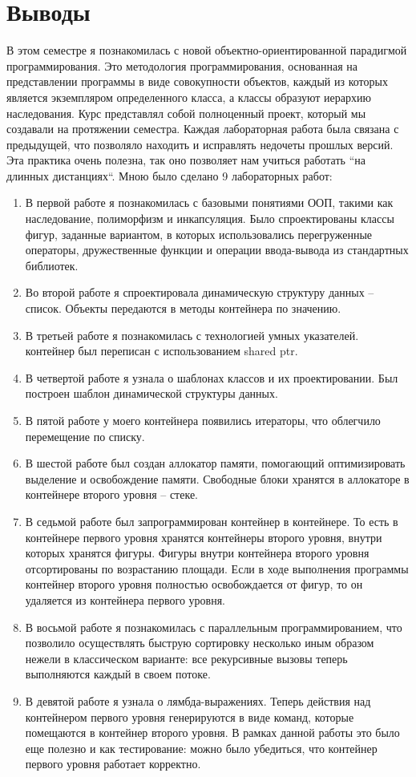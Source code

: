 \section{Выводы}

В этом семестре я познакомилась с новой объектно-ориентированной парадигмой программирования. Это методология программирования, основанная на представлении программы в виде совокупности объектов, каждый из которых является экземпляром определенного класса, а классы образуют иерархию наследования. Курс представлял собой полноценный проект, который мы создавали на протяжении семестра. Каждая лабораторная работа была связана с предыдущей, что позволяло находить и исправлять недочеты прошлых версий. Эта практика очень полезна, так оно позволяет нам учиться работать ``на длинных дистанциях``. Мною было сделано 9 лабораторных работ:
\begin{enumerate}
\item{В первой работе я познакомилась с базовыми понятиями ООП, такими как наследование, полиморфизм и инкапсуляция. Было спроектированы классы фигур, заданные вариантом, в которых использовались перегруженные операторы, дружественные функции и операции ввода-вывода из стандартных библиотек.}
\item{Во второй работе я спроектировала динамическую структуру данных -- список. Объекты передаются в методы контейнера по значению.}
\item{В третьей работе я познакомилась с технологией умных указателей. контейнер был переписан с использованием shared ptr. }
\item{В четвертой работе я узнала о шаблонах классов и их проектировании. Был построен шаблон динамической структуры данных. }
\item{В пятой работе у моего контейнера появились итераторы, что облегчило перемещение по списку.}
\item{В шестой работе был создан аллокатор памяти, помогающий оптимизировать выделение и освобождение памяти. Свободные блоки хранятся в аллокаторе в контейнере второго уровня -- стеке. }
\item{В седьмой работе был запрограммирован контейнер в контейнере. То есть в контейнере первого уровня хранятся контейнеры второго уровня, внутри которых хранятся фигуры. Фигуры внутри контейнера второго уровня отсортированы по возрастанию площади. Если в ходе выполнения программы контейнер второго уровня полностью освобождается от фигур, то он удаляется из контейнера первого уровня.}
\item{В восьмой работе я познакомилась с параллельным программированием, что позволило осуществлять быструю сортировку несколько иным образом нежели в классическом варианте: все рекурсивные вызовы теперь выполняются каждый в своем потоке.}
\item{В девятой работе я узнала о лямбда-выражениях. Теперь действия над контейнером первого уровня генерируются в виде команд, которые помещаются в контейнер второго уровня. В рамках данной работы это было еще полезно и как тестирование: можно было убедиться, что контейнер первого уровня работает корректно. }
\end{enumerate}


